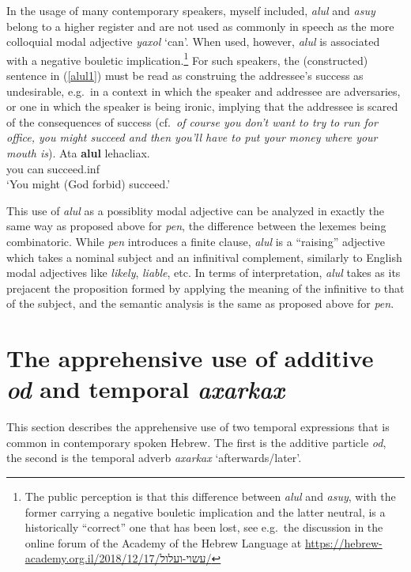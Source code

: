 \documentclass[output=paper,colorlinks,citecolor=brown]{langscibook}
\begin{document}
In the usage of many contemporary speakers, myself included,  \textit{alul} and \textit{asuy} belong to a higher register and are not used as commonly in speech as the more colloquial modal adjective \textit{yaxol} `can'. When used, however, \textit{alul} is associated with a negative bouletic implication.\footnote{The public perception is that this difference between \textit{alul} and \textit{asuy}, with the former carrying a negative bouletic implication and the latter neutral, is a historically ``correct'' one that has been lost, see e.g.\  the discussion in the online forum of the Academy of the Hebrew Language at \url{https://hebrew-academy.org.il/2018/12/17/עשוי-ועלול/}} For such speakers, the (constructed) sentence in (\ref{alul1}) must be read as construing the addressee's success as undesirable, e.g.\ in a context in which the speaker and addressee are adversaries, or one in which the speaker is being ironic, implying that the addressee is scared of the consequences of success (cf.\  \textit{of course you don't want to try to run for office, you might succeed and then you'll have to put your money where your mouth is}).  
\ea
\label{alul1}
\gll Ata \textbf{alul} lehacliax. \\
you can succeed.{\sc inf} \\
\glt `You might (God forbid) succeed.'
\z

This use of \textit{alul} as a possiblity modal adjective can be analyzed in exactly the same way as proposed above for \textit{pen}, the difference between the lexemes being combinatoric. While \textit{pen} introduces a finite clause, \textit{alul} is a ``raising'' adjective which takes a nominal subject and an infinitival complement, similarly to English modal adjectives like \textit{likely}, \textit{liable}, etc. In terms of interpretation, \textit{alul} takes as its prejacent the proposition formed by applying the meaning of the infinitive to that of the subject, and the semantic analysis is the same as proposed above for \textit{pen}. 





\section{The apprehensive use of additive \textit{od} and temporal \textit{axarkax}}
\label{sec:appradditivetemporal}
This section describes the apprehensive use of two temporal expressions that is common in contemporary spoken Hebrew. The first is the additive particle \textit{od}, the second is the temporal adverb \textit{axarkax} `afterwards/later'.
\end{document}
